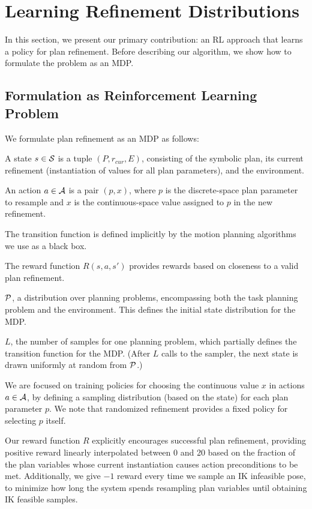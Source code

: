 \section{Learning Refinement Distributions}
In this section, we present our primary contribution: an RL
approach that learns a policy for plan refinement. Before describing our
algorithm, we show how to formulate the problem as an MDP.

\subsection{Formulation as Reinforcement Learning Problem}
We formulate plan refinement as an MDP as follows:
\begin{tightlist}
\item A state $s \in \mathcal{S}$ is a tuple $(P, r_{cur}, E)$, consisting of the
symbolic plan, its current refinement (instantiation of values for all plan parameters),
and the environment.
\item An action $a \in \mathcal{A}$ is a pair $(p, x)$, where $p$ is the discrete-space plan
parameter to resample and $x$ is the continuous-space value assigned to $p$ in the new refinement.
\item The transition function is defined implicitly by the motion planning algorithms we use as a black box.
\item The reward function $R(s, a, s')$ provides rewards based on closeness to a valid plan refinement.
\item $\mathcal{P}$, a distribution over planning problems, encompassing both the task planning problem
and the environment. This defines the initial state distribution for the MDP.
\item $L$, the number of samples for one planning problem, which partially defines the
transition function for the MDP. (After $L$ calls to the sampler, the next state is drawn uniformly
at random from $\mathcal{P}$.)
\end{tightlist}

We are focused on training policies for choosing the continuous value
$x$ in actions $a \in \mathcal{A}$, by defining a sampling distribution (based on the state) for each plan parameter $p$.
We note that randomized refinement provides a fixed policy for selecting $p$ itself.

Our reward function $R$ explicitly encourages successful plan refinement, providing positive reward linearly
interpolated between 0 and 20 based on the fraction of the plan variables whose current instantiation causes
action preconditions to be met. Additionally, we give $-1$ reward every time we sample an IK infeasible pose,
to minimize how long the system spends resampling plan variables until obtaining IK feasible samples.

